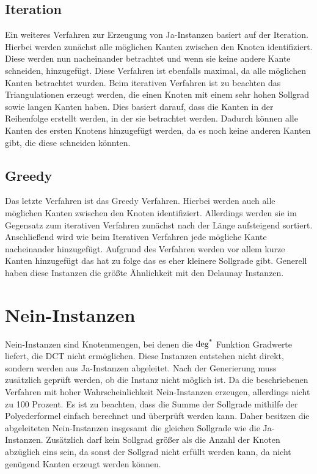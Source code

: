 \subsection{Iteration}
Ein weiteres Verfahren zur Erzeugung von Ja-Instanzen basiert auf der Iteration.
Hierbei werden zunächst alle möglichen Kanten zwischen den Knoten identifiziert.
Diese werden nun nacheinander betrachtet und wenn sie keine andere Kante schneiden, hinzugefügt.
Diese Verfahren ist ebenfalls maximal, da alle möglichen Kanten betrachtet wurden.
Beim iterativen Verfahren ist zu beachten das Triangulationen erzeugt werden, die einen Knoten mit einem sehr hohen Sollgrad sowie langen Kanten haben.
Dies basiert darauf, dass die Kanten in der Reihenfolge erstellt werden, in der sie betrachtet werden. 
Dadurch können alle Kanten des ersten Knotens hinzugefügt werden, da es noch keine anderen Kanten gibt, die diese schneiden könnten.



\subsection{Greedy}
Das letzte Verfahren ist das Greedy Verfahren.
Hierbei werden auch alle möglichen Kanten zwischen den Knoten identifiziert.
Allerdings werden sie im Gegensatz zum iterativen Verfahren zunächst nach der Länge aufsteigend sortiert.
Anschließend wird wie beim Iterativen Verfahren jede mögliche Kante nacheinander hinzugefügt.
Aufgrund des Verfahren werden vor allem kurze Kanten hinzugefügt das hat zu folge das es eher kleinere Sollgrade gibt.
Generell haben diese Instanzen die größte Ähnlichkeit mit den Delaunay Instanzen.


\section{Nein-Instanzen}
Nein-Instanzen sind Knotenmengen, bei denen die \(\operatorname{deg^*}\) Funktion Gradwerte liefert, die DCT nicht ermöglichen.
Diese Instanzen entstehen nicht direkt, sondern werden aus Ja-Instanzen abgeleitet.
Nach der Generierung muss zusätzlich geprüft werden, ob die Instanz nicht möglich ist.
Da die beschriebenen Verfahren mit hoher Wahrscheinlichkeit Nein-Instanzen erzeugen, allerdings nicht zu 100 Prozent.
Es ist zu beachten, dass die Summe der Sollgrade mithilfe der Polyederformel einfach berechnet und überprüft werden kann.
Daher besitzen die abgeleiteten Nein-Instanzen insgesamt die gleichen Sollgrade wie die Ja-Instanzen.
Zusätzlich darf kein Sollgrad größer als die Anzahl der Knoten abzüglich eins sein, da sonst der Sollgrad nicht erfüllt werden kann, da nicht genügend Kanten erzeugt werden können.

